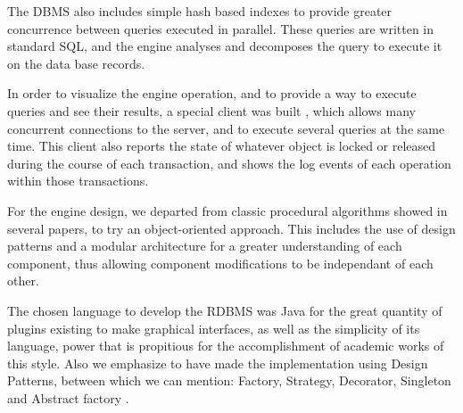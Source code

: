 The DBMS also includes simple hash based indexes to provide greater concurrence between queries executed in parallel. These queries are written in standard SQL, and the engine analyses and decomposes the query to execute it on the data base records.

In order to visualize the engine operation, and to provide a way to execute queries and see their results, a special client was built \cite{LBCP07a}, which allows many concurrent connections to the server, and to execute several queries at the same time. This client also reports the state of whatever object is locked or released during the course of each transaction, and shows the log events of each operation within those transactions.

For the engine design, we departed from classic procedural algorithms showed in several papers, to try an object-oriented approach. This includes the use of design patterns and a modular architecture for a greater understanding of each component, thus allowing component modifications to be independant of each other.

The chosen language to develop the RDBMS was Java for the great quantity of plugins existing to make graphical interfaces, as well as the simplicity of its language, power that is propitious for the accomplishment of academic works of this style. Also we emphasize to have made the implementation using Design Patterns, between which we can mention: Factory, Strategy, Decorator, Singleton and Abstract factory \cite{GHJV95}.
